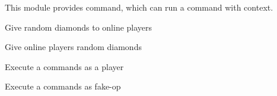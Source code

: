 
This module provides  command, which can run a command with context.


\begin{example}{Give random diamonds to online players}
\end{example}

\begin{example}{Give online players random diamonds}
\end{example}

\begin{example}{Execute a commands as a player}
\end{example}

\begin{example}{Execute a commands as fake-op}
\end{example}

